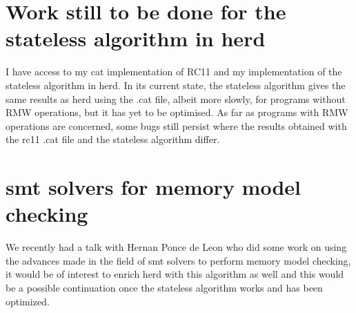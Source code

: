 \documentclass[a4,12pt]{article}
\begin{document}
\section{Work still to be done for the stateless algorithm in herd}

I have access to my cat implementation of RC11 and my implementation of the stateless algorithm in herd. In its current state, the stateless algorithm gives the same results as herd using the .cat file, albeit more slowly, for programs without RMW operations, but it has yet to be optimised. As far as programs with RMW operations are concerned, some bugs still persist where the results obtained with the rc11 .cat file and the stateless algorithm differ.

\section{smt solvers for memory model checking}

We recently had a talk with Hernan Ponce de Leon who did some work on using the advances made in the field of smt solvers to perform memory model checking, it would be of interest to enrich herd with this algorithm as well and this would be a possible continuation once the stateless algorithm works and has been optimized.
\end{document}
